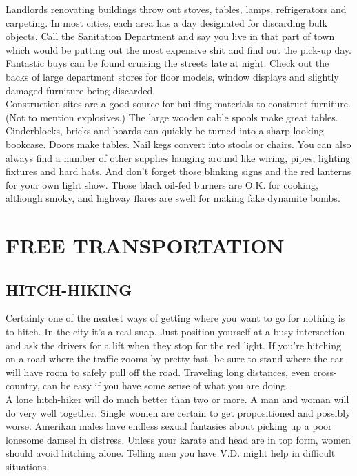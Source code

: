 \documentclass[11pt,twoside,a4paper]{book}
\begin{document}
Landlords renovating buildings throw out stoves, tables, lamps, refrigerators and carpeting. In most cities, each area has a day designated for discarding bulk objects. Call the Sanitation Department and say you live in that part of town which would be putting out the most expensive shit and find out the pick-up day. Fantastic buys can be found cruising the streets late at night. Check out the backs of large department stores for floor models, window displays and slightly damaged furniture being discarded.~\\

Construction sites are a good source for building materials to construct furniture. (Not to mention explosives.) The large wooden cable spools make great tables. Cinderblocks, bricks and boards can quickly be turned into a sharp looking bookcase. Doors make tables. Nail kegs convert into stools or chairs. You can also always find a number of other supplies hanging around like wiring, pipes, lighting fixtures and hard hats. And don't forget those blinking signs and the red lanterns for your own light show. Those black oil-fed burners are O.K. for cooking, although smoky, and highway flares are swell for making fake dynamite bombs.

\section{FREE TRANSPORTATION}

\subsection{HITCH-HIKING}

Certainly one of the neatest ways of getting where you want to go for nothing is to hitch. In the city it's a real snap. Just position yourself at a busy intersection and ask the drivers for a lift when they stop for the red light. If you're hitching on a road where the traffic zooms by pretty fast, be sure to stand where the car will have room to safely pull off the road. Traveling long distances, even cross-country, can be easy if you have some sense of what you are doing.~\\

A lone hitch-hiker will do much better than two or more. A man and woman will do very well together. Single women are certain to get propositioned and possibly worse. Amerikan males have endless sexual fantasies about picking up a poor lonesome damsel in distress. Unless your karate and head are in top form, women should avoid hitching alone. Telling men you have V.D. might help in difficult situations.~\\
\end{document}
